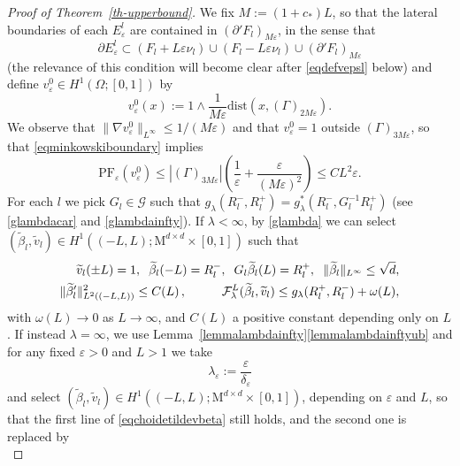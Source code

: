 \documentclass[a4paper,reqno]{amsart}
\newcommand\dist{{\mathrm{dist}}}
\newcommand\eps{{\varepsilon}}
\theoremstyle{remark}
\newcommand{\F}{\mathcal{F}}
\newcommand{\G}{\mathcal{G}}
\newcommand{\Mno}{\mathrm{M}^{d\times d}}
\newcommand\AT{\text{PF}}
\numberwithin{equation}{section}
\begin{document}
\begin{proof}[Proof of Theorem~\ref{th-upperbound}]
We fix $M:=(1+c_*)L$, so that the lateral boundaries of each $E^l_\eps$ are contained in
$(\partial'F_l)_{M\eps}$, in the sense that
\begin{equation}
 \partial E^l_\eps \subset (F_l+L\eps\nu_l)\cup (F_l-L\eps\nu_l) \cup (\partial'F_l)_{M\eps}
\end{equation}
(the relevance of this condition will become clear after \eqref{eqdefvepsl} below)
and define $v_\eps^0\in H^1(\Omega;[0,1])$ by
	\begin{equation*}
	v^0_\eps(x):=1\wedge \frac1{M\eps} \dist(x,(\Gamma)_{2M\eps}).
	\end{equation*}
	We observe that $\|\nabla v^0_\eps\|_{L^\infty}\le 1/(M\eps)$
	and that $v^0_\eps=1$ outside
	$(\Gamma)_{3M\eps}$, so that
	\eqref{eqminkowskiboundary} implies
	\begin{equation}\label{eqlimsupATeps}
		\AT_\eps(v^0_\eps)
		\le |(\Gamma)_{3M\eps}| \left(\frac1\eps + \frac{\eps}{(M\eps)^2}\right)\leq C L^2\eps.
	\end{equation}
	For each $l$ we pick
	$G_l\in\G$ such that $g_\lambda(R_l^-,R_l^+)= g_\lambda^*(R_l^-, G_l^{-1}R_l^+)$
	(see 
\eqref{glambdacar} and
\eqref{glambdainfty}). 
If $\lambda<\infty$, by \eqref{glambda} we can
select
	$(\widetilde \beta_l,\widetilde v_l)\in H^1((-L,L);\Mno\times[0,1])$
	such that
	\begin{equation}\label{eqchoidetildevbeta}
\begin{split}
	\widetilde v_l(\pm L)=1, \hskip2mm
\widetilde\beta_l(-L)= R^-_l,\hskip2mm
G_l\widetilde\beta_l(L)=R^+_l,\hskip2mm
\|\widetilde\beta_l\|_{L^\infty}\le \sqrt d,\\
\|\widetilde \beta_l'\|_{L^2((-L,L))}^2 \le C(L)\,,\hskip1cm
\F_\lambda^L(\widetilde\beta_l,\widetilde v_l)\le
g_\lambda(R^+_l, R^-_l)+\omega(L),
\end{split}\end{equation}
with $\omega(L)\to0$ as $L\to\infty$, and $C(L)$ a positive constant depending only on $L$.
If instead $\lambda=\infty$, we use
Lemma~\ref{lemmalambdainfty}\ref{lemmalambdainftyub} and for any fixed $\eps>0$ and $L>1$ we take
\begin{equation}\label{eq-lambdaepsL}
	\lambda_{\eps}:=\frac{\eps}{\delta_\eps}
\end{equation}
and select
	$(\widetilde \beta_l,\widetilde v_l)\in H^1((-L,L);\Mno\times[0,1])$, depending on $\eps$ and $L$,
so that the first line of \eqref{eqchoidetildevbeta} still holds, and the second one is replaced by
\begin{equation}\label{eqchoidetildevbetainfty}

\end{equation}
\end{proof}
\end{document}
